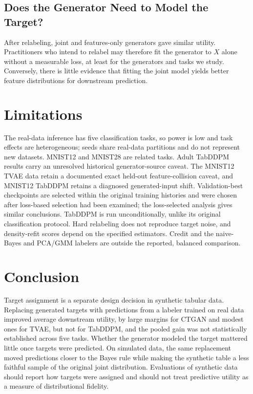 \documentclass[letterpaper]{article}
\begin{document}
\subsection{Does the Generator Need to Model the Target?}
After relabeling, joint and features-only generators gave similar utility.
Practitioners who intend to relabel may therefore fit the generator to $X$
alone without a measurable loss, at least for the generators and tasks we
study. Conversely, there is little evidence that fitting the joint model
yields better feature distributions for downstream prediction.

\section{Limitations}
The real-data inference has five classification tasks, so power is low and
task effects are heterogeneous; seeds share real-data partitions and do not
represent new datasets. MNIST12 and MNIST28 are related tasks. Adult
TabDDPM results carry an unresolved historical generator-source caveat. The
MNIST12 TVAE data retain a documented exact held-out feature-collision
caveat, and MNIST12 TabDDPM retains a diagnosed generated-input shift.
Validation-best checkpoints are selected within the original training
histories and were chosen after loss-based selection had been examined; the
loss-selected analysis gives similar conclusions. TabDDPM is run
unconditionally, unlike its original classification protocol. Hard
relabeling does not reproduce target noise, and density-refit scores depend
on the specified estimators. Credit and the naive-Bayes and PCA/GMM
labelers are outside the reported, balanced comparison.

\section{Conclusion}
Target assignment is a separate design decision in synthetic tabular data.
Replacing generated targets with predictions from a labeler trained on real
data improved average downstream utility, by large margins for CTGAN and
modest ones for TVAE, but not for TabDDPM, and the pooled gain was not
statistically established across five tasks. Whether the generator modeled
the target mattered little once targets were predicted. On simulated
data, the same replacement moved predictions closer to the Bayes
rule while making the synthetic table a less faithful sample of the
original joint distribution. Evaluations of synthetic data should report
how targets were assigned and should not treat predictive utility as a
measure of distributional fidelity.


\end{document}

